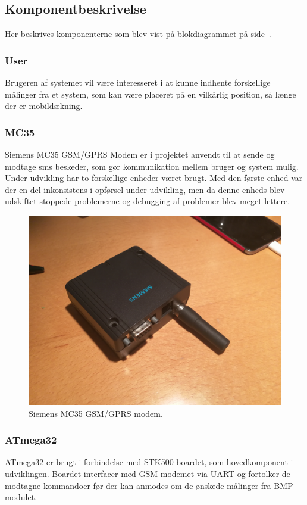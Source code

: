 \subsection{Komponentbeskrivelse}\label{sec:blockdescription}
Her beskrives komponenterne som blev vist på blokdiagrammet på side~\pageref{fig:blockdiagram}. 

\subsubsection{User}
Brugeren af systemet vil være interesseret i at kunne indhente forskellige målinger fra et system, som kan være placeret på en vilkårlig position, så længe der er mobildækning.

\subsubsection{MC35}
Siemens MC35 GSM/GPRS Modem er i projektet anvendt til at sende og modtage sms beskeder, som gør kommunikation mellem bruger og system mulig. Under udvikling har to forskellige enheder været brugt. Med den første enhed var der en del inkonsistens i opførsel under udvikling, men da denne enheds blev udskiftet stoppede problemerne og debugging af problemer blev meget lettere.

\begin{figure}[h]
	\centering
	\includegraphics[width=0.7\linewidth]{figs/device_gsm.jpg}
	\caption{Siemens MC35 GSM/GPRS modem.}
	\label{fig:devicegsm}
\end{figure}

\subsubsection{ATmega32}
ATmega32 er brugt i forbindelse med STK500 boardet, som hovedkomponent i udviklingen. Boardet interfacer med GSM modemet via UART og fortolker de modtagne kommandoer før der kan anmodes om de ønskede målinger fra BMP modulet.

